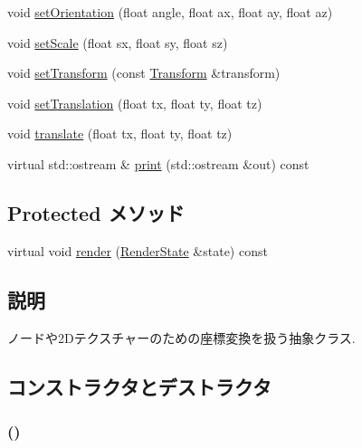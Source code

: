 \begin{CompactItemize}
void \hyperlink{classm3g_1_1Transformable_980a9a2b5f6102763042e616d3aa4606}{setOrientation} (float angle, float ax, float ay, float az)
\item 
void \hyperlink{classm3g_1_1Transformable_937d04042c25021532ea2532fe5e3a32}{setScale} (float sx, float sy, float sz)
\item 
void \hyperlink{classm3g_1_1Transformable_05052269aaf19775f3ff1a10d042777e}{setTransform} (const \hyperlink{classm3g_1_1Transform}{Transform} \&transform)
\item 
void \hyperlink{classm3g_1_1Transformable_afd728a7db85b8e12bdafc2b3c08a515}{setTranslation} (float tx, float ty, float tz)
\item 
void \hyperlink{classm3g_1_1Transformable_66d493b8307a85e615c4eb89116f2e09}{translate} (float tx, float ty, float tz)
\item 
virtual std::ostream \& \hyperlink{classm3g_1_1Transformable_6fea17fa1532df3794f8cb39cb4f911f}{print} (std::ostream \&out) const 
\end{CompactItemize}
\subsection*{Protected メソッド}
\begin{CompactItemize}
\item 
virtual void \hyperlink{classm3g_1_1Transformable_8babc8a79b78615da51161e94029eea9}{render} (\hyperlink{structm3g_1_1RenderState}{RenderState} \&state) const 
\end{CompactItemize}


\subsection{説明}
ノードや2Dテクスチャーのための座標変換を扱う抽象クラス. 

\subsection{コンストラクタとデストラクタ}
\hypertarget{classm3g_1_1Transformable_ca6563203e3e883391c9d0927028aa04}{
\subsubsection[{Transformable}]{ ()}}
\label{classm3g_1_1Transformable_ca6563203e3e883391c9d0927028aa04}


